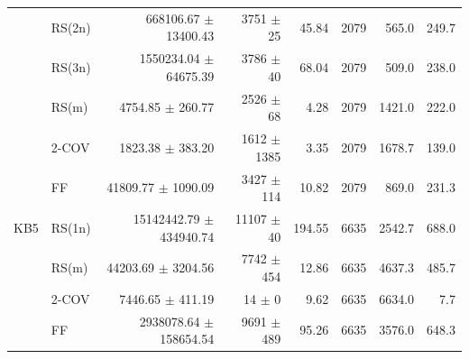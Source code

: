 \begin{table}[htbp]
\begin{tabular}{llrrrrrr}
 & RS(2n) & 668106.67 $\pm$ 13400.43 & 3751 $\pm$ 25 & 45.84 & 2079 & 565.0 & 249.7 \\
 & RS(3n) & 1550234.04 $\pm$ 64675.39 & 3786 $\pm$ 40 & 68.04 & 2079 & 509.0 & 238.0 \\
 & RS(m) & 4754.85 $\pm$ 260.77 & 2526 $\pm$ 68 & 4.28 & 2079 & 1421.0 & 222.0 \\
 & 2-COV & 1823.38 $\pm$ 383.20 & 1612 $\pm$ 1385 & 3.35 & 2079 & 1678.7 & 139.0 \\
 & FF & 41809.77 $\pm$ 1090.09 & 3427 $\pm$ 114 & 10.82 & 2079 & 869.0 & 231.3 \\
\midrule
KB5 & RS(1n) & 15142442.79 $\pm$ 434940.74 & 11107 $\pm$ 40 & 194.55 & 6635 & 2542.7 & 688.0 \\
 & RS(m) & 44203.69 $\pm$ 3204.56 & 7742 $\pm$ 454 & 12.86 & 6635 & 4637.3 & 485.7 \\
 & 2-COV & 7446.65 $\pm$ 411.19 & 14 $\pm$ 0 & 9.62 & 6635 & 6634.0 & 7.7 \\
 & FF & 2938078.64 $\pm$ 158654.54 & 9691 $\pm$ 489 & 95.26 & 6635 & 3576.0 & 648.3 \\
\bottomrule
\end{tabular}
\end{table}

